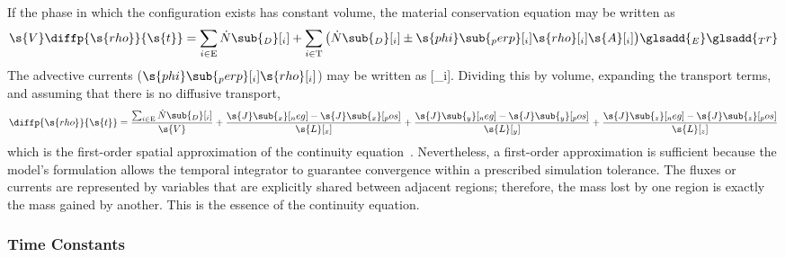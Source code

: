 If the phase in which the configuration exists has constant volume, the material conservation equation may be written as
\begin{equation}
  \s{V}\diffp{\s{rho}}{\s{t}} = \sum_{i \in \text{E}}\dot{N}\sub{_D}[_i] + \sum_{i \in \text{T}}\big(\dot{N}\sub{_D}[_i] \pm \s{phi}\sub{_perp}[_i]\s{rho}[_i]\s{A}[_i]\big)
  \glsadd{_E}
  \glsadd{_Tr}
\end{equation}
The advective currents ($\s{phi}\sub{_perp}[_i]\s{rho}[_i]$) may be written as [_i].  Dividing this by volume, expanding the transport terms, and assuming that there is no diffusive transport\label{mark:Continuity},
\begin{equation}
  \diffp{\s{rho}}{\s{t}} = \frac{\sum_{i \in \text{E}}\dot{N}\sub{_D}[_i]}{\s{V}} + \frac{\s{J}\sub{_x}[_neg] - \s{J}\sub{_x}[_pos]}{\s{L}[_x]} + \frac{\s{J}\sub{_y}[_neg] - \s{J}\sub{_y}[_pos]}{\s{L}[_y]} + \frac{\s{J}\sub{_z}[_neg] - \s{J}\sub{_z}[_pos]}{\s{L}[_z]}
\end{equation}
which is the first-order spatial approximation of the continuity equation~\cite{Incropera2002, Fluent6.3}. %
Nevertheless, a first-order approximation is sufficient because the model's formulation allows the temporal integrator to guarantee convergence within a prescribed simulation tolerance.  The fluxes or currents are represented by variables that are explicitly shared between adjacent regions; therefore, the mass lost by one region is exactly the mass gained by another.  This is the essence of the continuity equation.


\subsubsection{Time Constants}
\label{sec:MaterialTime}


